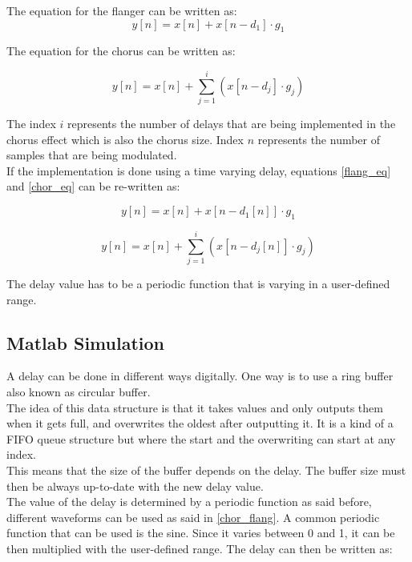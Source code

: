 The equation for the flanger can be written as:
\begin{equation}
\label{flang_eq}
		y[n] = x[n] + x[n- d_{1}] \cdot g_{1}  
\end{equation}

The equation for the chorus can be written as:

\begin{equation}
\label{chor_eq}
y[n] = x[n] + \sum_{j=1}^{i}  (x[n- d_{j}] \cdot g_{j})
\end{equation}

The index $i$ represents the number of delays that are being implemented in the chorus effect which is also the chorus size. Index $n$ represents the number of samples that are being modulated. \\
If the implementation is done using a time varying delay, equations \ref{flang_eq} and \ref{chor_eq} can be re-written as:

\begin{equation}
\label{flang_eq2}
y[n] = x[n] + x[n- d_{1}[n]] \cdot g_{1}  
\end{equation}

\begin{equation}
\label{chor_eq2}
y[n] = x[n] + \sum_{j=1}^{i}  (x[n- d_{j}[n]] \cdot g_{j})
\end{equation}

The delay value has to be a periodic function that is varying in a user-defined range. 

\subsection{Matlab Simulation}

A delay can be done in different ways digitally. One way is to use a ring buffer also known as circular buffer. \\
The idea of this data structure is that it takes values and only outputs them when it gets full, and overwrites the oldest after outputting it. It is a kind of a FIFO queue structure but where the start and the overwriting can start at any index. \\
This means that the size of the buffer depends on the delay.  The buffer size must then be always up-to-date with the new delay value. \\ 
The value of the delay is determined by a periodic function as said before, different waveforms can be used as said in \autoref{chor_flang}. A common periodic function that can be used is the sine. Since it varies between 0 and 1, it can be then multiplied with the user-defined range. 
The delay can then be written as:

